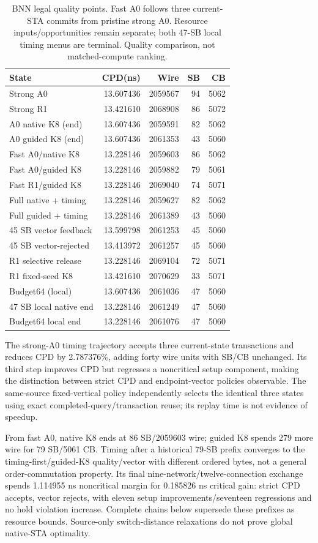 \documentclass[conference,10pt]{IEEEtran}
\begin{document}
\begin{table}[t]
\centering\caption{BNN legal quality points. Fast A0 follows three current-STA commits from pristine strong A0. Resource inputs/opportunities remain separate; both 47-SB local timing menus are terminal. Quality comparison, not matched-compute ranking.}
\label{tab:bnn}
\small
\begin{tabular}{lrrrr}\hline
State & CPD(ns) & Wire & SB & CB\\\hline
Strong A0 &13.607436&2059567&94&5062\\
Strong R1 &13.421610&2068908&86&5072\\
A0 native K8 (end) &13.607436&2059591&82&5062\\
A0 guided K8 (end) &13.607436&2061353&43&5060\\
Fast A0/native K8 &13.228146&2059603&86&5062\\
Fast A0/guided K8 &13.228146&2059882&79&5061\\
Fast R1/guided K8 &13.228146&2069040&74&5071\\
Full native + timing &13.228146&2059627&82&5062\\
Full guided + timing &13.228146&2061389&43&5060\\
45 SB vector feedback &13.599798&2061253&45&5060\\
45 SB vector-rejected &13.413972&2061257&45&5060\\
R1 selective release &13.228146&2069104&72&5071\\
R1 fixed-seed K8 &13.421610&2070629&33&5071\\
Budget64 (local) &13.607436&2061036&47&5060\\
47 SB local native end &13.228146&2061249&47&5060\\
Budget64 local end &13.228146&2061076&47&5060\\\hline
\end{tabular}
\end{table}
The strong-A0 timing trajectory accepts three current-state transactions and reduces CPD by 2.787376\%, adding forty wire units with SB/CB unchanged. Its third step improves CPD but regresses a noncritical setup component, making the distinction between strict CPD and endpoint-vector policies observable. The same-source fixed-vertical policy independently selects the identical three states using exact completed-query/transaction reuse; its replay time is not evidence of speedup.

From fast A0, native K8 ends at 86 SB/2059603 wire; guided K8 spends 279 more wire for 79 SB/5061 CB. Timing after a historical 79-SB prefix converges to the timing-first/guided-K8 quality/vector with different ordered bytes, not a general order-commutation property. Its final nine-network/twelve-connection exchange spends 1.114955 ns noncritical margin for 0.185826 ns critical gain: strict CPD accepts, vector rejects, with eleven setup improvements/seventeen regressions and no hold violation increase. Complete chains below supersede these prefixes as resource bounds. Source-only switch-distance relaxations do not prove global native-STA optimality.
\end{document}

